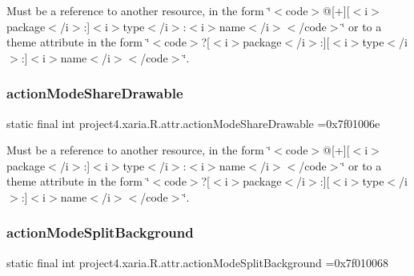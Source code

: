 Must be a reference to another resource, in the form \char`\"{}$<$code$>$@\mbox{[}+\mbox{]}\mbox{[}$<$i$>$package$<$/i$>$\+:\mbox{]}$<$i$>$type$<$/i$>$\+:$<$i$>$name$<$/i$>$$<$/code$>$\char`\"{} or to a theme attribute in the form \char`\"{}$<$code$>$?\mbox{[}$<$i$>$package$<$/i$>$\+:\mbox{]}\mbox{[}$<$i$>$type$<$/i$>$\+:\mbox{]}$<$i$>$name$<$/i$>$$<$/code$>$\char`\"{}. \mbox{\label{classproject4_1_1xaria_1_1R_1_1attr_ac90de15cb9e25cdc3c0b1588df74b451}} 
\subsubsection{\texorpdfstring{action\+Mode\+Share\+Drawable}{actionModeShareDrawable}}
{\footnotesize\ttfamily static final int project4.\+xaria.\+R.\+attr.\+action\+Mode\+Share\+Drawable =0x7f01006e\hspace{0.3cm}{\ttfamily [static]}}

Must be a reference to another resource, in the form \char`\"{}$<$code$>$@\mbox{[}+\mbox{]}\mbox{[}$<$i$>$package$<$/i$>$\+:\mbox{]}$<$i$>$type$<$/i$>$\+:$<$i$>$name$<$/i$>$$<$/code$>$\char`\"{} or to a theme attribute in the form \char`\"{}$<$code$>$?\mbox{[}$<$i$>$package$<$/i$>$\+:\mbox{]}\mbox{[}$<$i$>$type$<$/i$>$\+:\mbox{]}$<$i$>$name$<$/i$>$$<$/code$>$\char`\"{}. \mbox{\label{classproject4_1_1xaria_1_1R_1_1attr_aeee48489a676307cf6ee4c9f2d435d5a}} 
\subsubsection{\texorpdfstring{action\+Mode\+Split\+Background}{actionModeSplitBackground}}
{\footnotesize\ttfamily static final int project4.\+xaria.\+R.\+attr.\+action\+Mode\+Split\+Background =0x7f010068\hspace{0.3cm}{\ttfamily [static]}}

